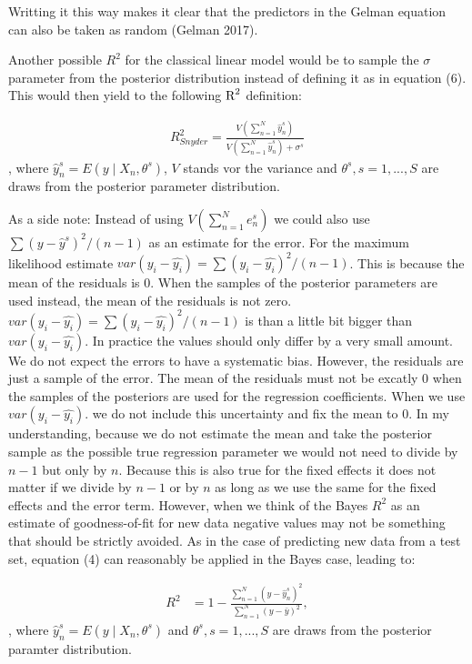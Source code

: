 \documentclass[11pt,a4paper,twoside]{book}
\begin{document}
Writting it this way makes it clear that the predictors in the Gelman equation can also be taken as random (Gelman 2017). 

Another possible $R^2$ for the classical linear model would be to sample the  $\sigma$ parameter from the posterior distribution instead of defining it as in equation (6). This would then yield to the following $\text{R}^2$ definition:

    \begin{align} 
        R^2_{Snyder} = \frac{V(\sum_{n=1}^{N}\hat{y}^s_{n})}{V(\sum_{n=1}^{N}\hat{y}^s_{n})+\sigma^s} \label{eq:11} 
   \end{align} 
 , where $\hat{y}^s_{n}  = E \left({y \mid X_{n}, \theta^s}\right) $,  $V$ stands vor the variance and $\theta^s, s = 1, ... , S$ are draws from the posterior parameter distribution.
 
As a side note: Instead of using $V(\sum_{n=1}^{N}e^s_{n})$ we could also use $ \sum(y - \hat{y}^s)^2/(n-1) $ as an estimate for the error. For the maximum likelihood estimate $var(y_{i} - \hat{y_{i}}) = \sum (y_{i} - \hat{y_{i}})^2/ (n-1) $. This is because the mean of the residuals is 0. When the  samples of the posterior parameters are used instead, the mean of the residuals is not zero. $var(y_{i} - \hat{y_{i}}) = \sum (y_{i} - \hat{y_{i}})^2/ (n-1) $ is than a little bit bigger than $var(y_{i} - \hat{y_{i}}). $ In practice the values should only differ by a very small amount. We do not expect the errors to have a systematic bias. However, the residuals are just a sample of the error. The mean of the residuals must not be excatly 0 when the samples of the posteriors are used for the regression coefficients. When we use $var(y_{i} - \hat{y_{i}}). $ we do not include this uncertainty and fix the mean to 0. In my understanding, because we do not estimate the mean and take the posterior sample as the possible true regression parameter we would not need to divide by $n-1$ but only by $n$. Because this is also true for the fixed effects it does not matter if we divide by $n-1$ or by $n$ as long as we use the same for the fixed effects and the error term.  However, when we think of the Bayes $R^2$ as an estimate of goodness-of-fit for new data negative values may not be something that should be strictly avoided. As in the case of predicting new data from a test set, equation (4) can reasonably be applied in the Bayes case, leading to:

      \begin{align} 
        R^2 &= 1 - \frac{\sum_{n=1}^{N}(y - \hat{y}^s_{n})^2}{\sum_{n=1}^{N}(y-\bar{y})^2}   \label{eq:7},
    \end{align} 
, where $\hat{y}^s_{n}  = E \left({y \mid X_{n}, \theta^s}\right) $ and $\theta^s, s = 1, ... , S$ are draws from the posterior paramter distribution.
\end{document}
